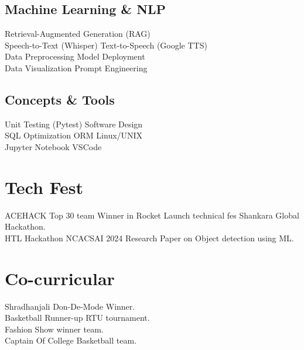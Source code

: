 \documentclass[]{deedy-resume-reversed}
\begin{document}
\begin{minipage}[t]{0.33\textwidth}
\subsection{Machine Learning \& NLP}
Retrieval-Augmented Generation (RAG) \\
Speech-to-Text (Whisper) \textbullet{} Text-to-Speech (Google TTS) \\
Data Preprocessing \textbullet{} Model Deployment \\
Data Visualization \textbullet{} Prompt Engineering
\sectionsep

\subsection{Concepts \& Tools}
Unit Testing (Pytest) \textbullet{} Software Design \\
SQL Optimization \textbullet{} ORM \textbullet{} Linux/UNIX \\
Jupyter Notebook \textbullet{} VSCode
\sectionsep


\section{Tech Fest}
ACEHACK Top 30 team Winner in Rocket Launch technical fes Shankara Global Hackathon. \\
HTL Hackathon NCACSAI 2024 Research Paper on Object detection using ML.
\sectionsep


\section{Co-curricular}
Shradhanjali Don-De-Mode Winner. \\
Basketball Runner-up RTU tournament. \\
Fashion Show winner team. \\
Captain Of College Basketball team.
\sectionsep

\end{minipage}
\end{document}
